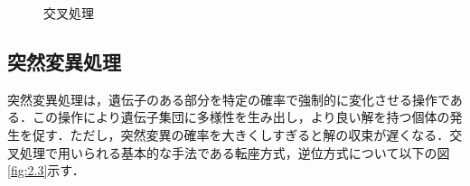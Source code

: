 \newpage

\begin{figure}[p]
\begin{center}





\caption{交叉処理}
\label{tb:cross}


\end{center}

\end{figure}



\clearpage



\subsection{突然変異処理}
\label{sec2.1.5}

突然変異処理は，遺伝子のある部分を特定の確率で強制的に変化させる操作である．この操作により遺伝子集団に多様性を生み出し，より良い解を持つ個体の発生を促す．ただし，突然変異の確率を大きくしすぎると解の収束が遅くなる．交叉処理で用いられる基本的な手法である転座方式，逆位方式について以下の図\ref{fig:2.3}示す．

